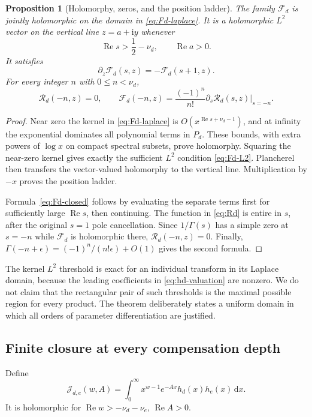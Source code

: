 \documentclass[11pt,a4paper]{article}
\newtheorem{proposition}[theorem]{Proposition}
\theoremstyle{definition}
\numberwithin{equation}{section}
\newcommand{\Rea}{\operatorname{Re}}
\newcommand{\dd}{\,\mathrm d}
\newcommand{\ii}{\mathrm i}
\begin{document}
\begin{proposition}[Holomorphy, zeros, and the position ladder]
\label{thm:Fd-domain}
The family $\mathcal F_d$ is jointly holomorphic on the domain in
\eqref{eq:Fd-laplace}. It is a holomorphic $L^2$ vector on the vertical
line $z=a+\ii y$ whenever
\begin{equation}\label{eq:Fd-L2}
 \Rea s>\frac12-\nu_d,\qquad\Rea a>0.
\end{equation}
It satisfies
\begin{equation}\label{eq:Fd-ladder}
 \partial_z\mathcal F_d(s,z)=-\mathcal F_d(s+1,z).
\end{equation}
For every integer $n$ with $0\le n<\nu_d$,
\begin{equation}\label{eq:Rd-zero}
 \mathcal R_d(-n,z)=0,\qquad
 \mathcal F_d(-n,z)=\frac{(-1)^n}{n!}
                    \left.\partial_s\mathcal R_d(s,z)\right|_{s=-n}.
\end{equation}
\end{proposition}
\begin{proof}
Near zero the kernel in \eqref{eq:Fd-laplace} is
$O(x^{\Rea s+\nu_d-1})$, and at infinity the exponential dominates
all polynomial terms in $P_d$. These bounds, with extra powers of
$\log x$ on compact spectral subsets, prove holomorphy. Squaring the
near-zero kernel gives exactly the sufficient $L^2$ condition
\eqref{eq:Fd-L2}. Plancherel then transfers the vector-valued holomorphy
to the vertical line. Multiplication by $-x$ proves the position ladder.

Formula~\eqref{eq:Fd-closed} follows by evaluating the separate terms
first for sufficiently large $\Rea s$, then continuing.
The function in \eqref{eq:Rd} is entire in $s$, after the original
$s=1$ pole cancellation. Since $1/\Gamma(s)$ has a simple zero at
$s=-n$ while $\mathcal F_d$ is holomorphic there, $\mathcal R_d(-n,z)=0$.
Finally,
$\Gamma(-n+\epsilon)=(-1)^n/(n!\epsilon)+O(1)$ gives the second formula.
\end{proof}

The kernel $L^2$ threshold is exact for an individual transform in its
Laplace domain, because the leading coefficients in
\eqref{eq:hd-valuation} are nonzero. We do not claim that the rectangular
pair of such thresholds is the maximal possible region for every product.
The theorem deliberately states a uniform domain in which all orders of
parameter differentiation are justified.

\subsection{Finite closure at every compensation depth}
Define
\begin{equation}\label{eq:J-integral}
 \mathcal J_{d,e}(w,A)=\int_0^\infty
          x^{w-1}e^{-Ax}h_d(x)h_e(x)\dd x.
\end{equation}
It is holomorphic for
$\Rea w>-\nu_d-\nu_e$, $\Rea A>0$.
\end{document}
